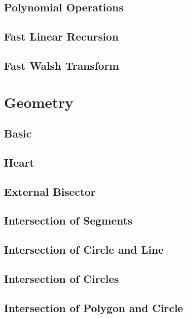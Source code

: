 \subsection{Polynomial Operations}

\subsection{Fast Linear Recursion}

\subsection{Fast Walsh Transform}


\section{Geometry}
\subsection{Basic}

\subsection{Heart}

\subsection{External Bisector}

\subsection{Intersection of Segments}

\subsection{Intersection of Circle and Line}

\subsection{Intersection of Circles}

\subsection{Intersection of Polygon and Circle}

